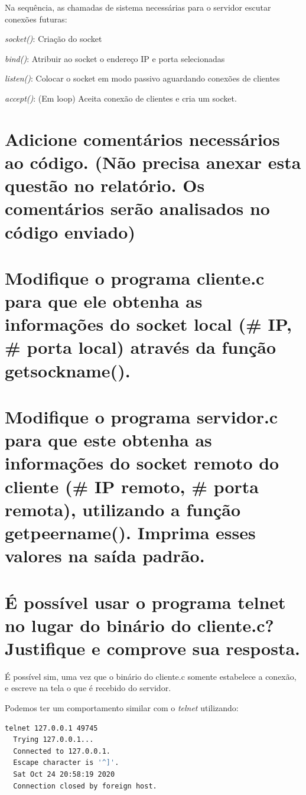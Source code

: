 \documentclass[12pt,a4paper]{report}
\begin{document}
Na sequência, as chamadas de sistema necessárias para o servidor escutar conexões futuras:

\emph{socket()}: Criação do socket

\emph{bind()}: Atribuir ao socket o endereço IP e porta selecionadas

\emph{listen()}: Colocar o socket em modo passivo aguardando conexões de clientes

\emph{accept()}: (Em loop) Aceita conexão de clientes e cria um socket.

\section{Adicione comentários necessários ao código. (Não precisa anexar esta questão no relatório. Os
comentários serão analisados no código enviado)}

\section{Modifique o programa cliente.c para que ele obtenha as informações do socket local (\# IP, \#
porta local) através da função getsockname().}

\section{Modifique o programa servidor.c para que este obtenha as informações do socket remoto do
cliente (\# IP remoto, \# porta remota), utilizando a função getpeername(). Imprima esses
valores na saída padrão.}

\section{É possível usar o programa telnet no lugar do binário do cliente.c? Justifique e comprove sua
resposta.}

É possível sim, uma vez que o binário do cliente.c somente estabelece a conexão, e escreve na tela o que é recebido do servidor.

\bigbreak

Podemos ter um comportamento similar com o \emph{telnet} utilizando:

\begin{lstlisting}[language=bash]
  telnet 127.0.0.1 49745
  Trying 127.0.0.1...
  Connected to 127.0.0.1.
  Escape character is '^]'.
  Sat Oct 24 20:58:19 2020
  Connection closed by foreign host.  
\end{lstlisting}
\end{document}
